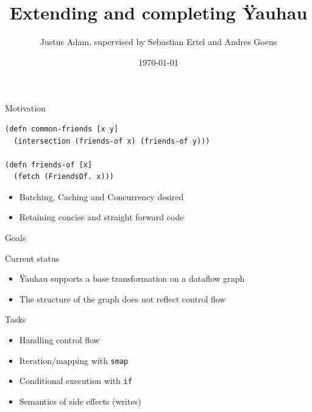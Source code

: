 \documentclass[utf8x,10pt,aspectratio=169]{beamer}
\title{Extending and completing Ÿauhau}
\author{Justus Adam, supervised by Sebastian Ertel and Andres Goens}
\date{\today}
\begin{document}
\normalsize
\maketitle

\begin{frame}[fragile]{Motivation}
	
\begin{verbatim}
(defn common-friends [x y]
  (intersection (friends-of x) (friends-of y)))

(defn friends-of [x]
  (fetch (FriendsOf. x)))
\end{verbatim}
\pause
\begin{itemize}[<+->]
	\item Batching, Caching and Concurrency desired
	\item Retaining concise and straight forward code
\end{itemize}

\end{frame}
\addtocounter{framenumber}{-1}

\begin{frame}{Goals}
	\pause
	\begin{block}{Current status}
		\begin{itemize}[<+->]
			\item Ÿauhau supports a base transformation on a dataflow graph
			\item The structure of the graph does not reflect control flow
		\end{itemize}
	\end{block}
	\pause
	\begin{block}{Tasks}
		\begin{itemize}[<+->]
			\item Handling control flow
			\item Iteration/mapping with \texttt{smap}
			\item Conditional execution with \texttt{if}
			\item Semantics of side effects (writes)
		\end{itemize}
	\end{block}
\end{frame}
\end{document}
